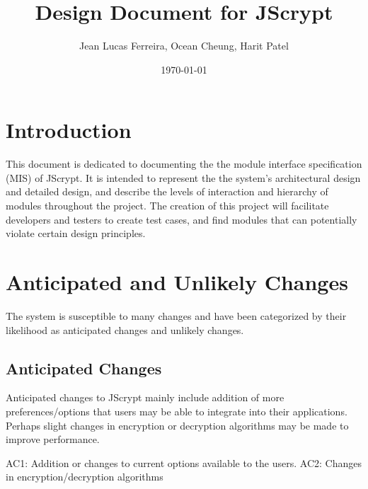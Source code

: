 \documentclass[12pt]{article}
\begin{document}
\title{Design Document for JScrypt}
\author{Jean Lucas Ferreira, Ocean Cheung, Harit Patel}

\date{\today}

\maketitle


\newpage
  \tableofcontents

\newpage


\section{Introduction}

 This document is dedicated to documenting the the module interface specification (MIS) of JScrypt. It is intended to represent the the system’s architectural design and detailed design, and describe the levels of interaction and hierarchy of modules throughout the project. The creation of this project will facilitate developers and testers to create test cases, and find modules that can potentially violate certain design principles.

\section{Anticipated and Unlikely Changes}

The system is susceptible to many changes and have been categorized by their likelihood as anticipated changes and unlikely changes.

\subsection{Anticipated Changes}
Anticipated changes to JScrypt mainly include addition of more preferences/options that users may be able to integrate into their applications. Perhaps slight changes in encryption or decryption algorithms may be made to improve performance. \newline

AC1: Addition or changes to current options available to the users. \newline
AC2: Changes in encryption/decryption algorithms
\end{document}

